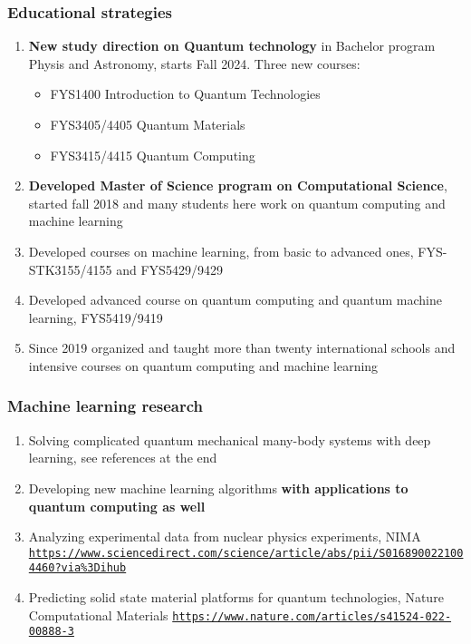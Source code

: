\documentclass{beamer}
\begin{document}
\begin{frame}
\frametitle{Educational strategies}

\begin{enumerate}
\item \textbf{New study direction on Quantum technology} in Bachelor program Physis and Astronomy, starts Fall 2024. Three new courses:
\begin{itemize}

  \item FYS1400 Introduction to Quantum Technologies

  \item FYS3405/4405 Quantum Materials

  \item FYS3415/4415 Quantum Computing

\end{itemize}

\noindent
\item \textbf{Developed Master of Science program on Computational Science}, started fall  2018 and many students here work on quantum computing and machine learning

\item Developed courses on machine learning, from basic to advanced ones, FYS-STK3155/4155 and FYS5429/9429

\item Developed advanced course on quantum computing and quantum machine learning, FYS5419/9419

\item Since 2019 organized and taught more than twenty  international schools and intensive courses on quantum computing and machine learning
\end{enumerate}

\noindent
\end{frame}

\begin{frame}
\frametitle{Machine learning research}

\begin{enumerate}
\item Solving complicated quantum mechanical many-body systems with deep learning, see references at the end

\item Developing new machine learning algorithms \textbf{with applications to quantum computing as well}

\item Analyzing experimental data from nuclear physics experiments, NIMA \href{{https://www.sciencedirect.com/science/article/abs/pii/S0168900221004460?via%

\item Predicting solid state material platforms for quantum technologies, Nature Computational Materials \href{{https://www.nature.com/articles/s41524-022-00888-3}}{\nolinkurl{https://www.nature.com/articles/s41524-022-00888-3}} 
\end{enumerate}

\noindent
\end{frame}
\end{document}
